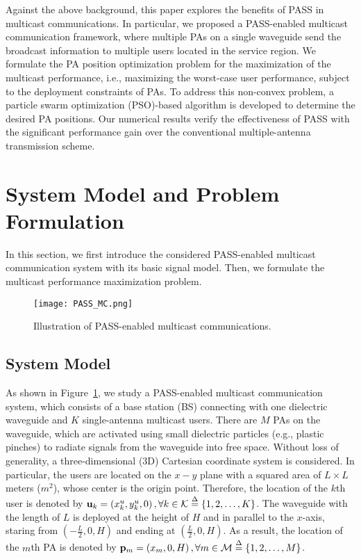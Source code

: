 \documentclass[summary]{ursi}
\begin{document}
Against the above background, this paper explores the benefits of PASS in multicast communications. In particular, we proposed a PASS-enabled multicast communication framework, where multiple PAs on a single waveguide send the broadcast information to multiple users located in the service region. We formulate the PA position optimization problem for the maximization of the multicast performance, i.e., maximizing the worst-case user performance, subject to the deployment constraints of PAs. To address this non-convex problem, a particle swarm optimization (PSO)-based algorithm is developed to determine the desired PA positions. Our numerical results verify the effectiveness of PASS with the significant performance gain over the conventional multiple-antenna transmission scheme.


\section{System Model and Problem Formulation}
In this section, we first introduce the considered PASS-enabled multicast communication system with its basic signal model. Then, we formulate the multicast performance maximization problem.

\begin{figure}[htbp]
  \centering
  \texttt{[image: PASS\_MC.png]}
  \caption{Illustration of PASS-enabled multicast communications.}
  \label{fig:MC}
\end{figure}
\subsection{System Model}
As shown in Figure~\ref{fig:MC}, we study a PASS-enabled multicast communication system, which consists of a base station (BS) connecting with one dielectric waveguide and $K$ single-antenna multicast users. There are $M$ PAs on the waveguide, which are activated using small dielectric particles (e.g., plastic pinches) to radiate signals from the waveguide into free space. Without loss of generality, a three-dimensional (3D) Cartesian coordinate system is considered. In particular, the users are located on the $x-y$ plane with a squared area of $L \times L$ meters ($m^2$), whose center is the origin point. Therefore, the location of the $k$th user is denoted by ${{\bf{u}}_k} = \left( {x_k^u,y_k^u,0} \right),\forall k \in \mathcal{K}  \buildrel \Delta \over = \left\{ {1,2, \ldots ,K} \right\}$. The waveguide with the length of $L$ is deployed at the height of $H$ and in parallel to the $x$-axis, staring from $\left( { - \frac{L}{2},0,H} \right)$ and ending at $\left( { \frac{L}{2},0,H} \right)$. As a result, the location of the $m$th PA is denoted by ${{\bf{p}}_m} = \left( {{x_m},0,H} \right),\forall m \in \mathcal{M}  \buildrel \Delta \over = \left\{ {1,2, \ldots ,M} \right\}$. 
\end{document}
